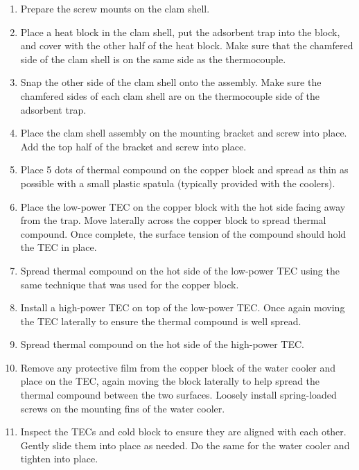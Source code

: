 \begin{enumerate}
\item Prepare the screw mounts on the clam shell.
    
\item Place a heat block in the clam shell, put the adsorbent trap into the block, and cover with the other half of the heat block. Make sure that the chamfered side of the clam shell is on the same side as the thermocouple.
    
\item Snap the other side of the clam shell onto the assembly. Make sure the chamfered sides of each clam shell are on the thermocouple side of the adsorbent trap.
    
\item Place the clam shell assembly on the mounting bracket and screw into place. Add the top half of the bracket and screw into place.
    
\item Place 5 dots of thermal compound on the copper block and spread as thin as possible with a small plastic spatula (typically provided with the coolers).
    
\item Place the low-power TEC on the copper block with the hot side facing away from the trap. Move laterally across the copper block to spread thermal compound. Once complete, the surface tension of the compound should hold the TEC in place.
    
\item Spread thermal compound on the hot side of the low-power TEC using the same technique that was used for the copper block.
    
\item Install a high-power TEC on top of the low-power TEC. Once again moving the TEC laterally to ensure the thermal compound is well spread.
    
\item Spread thermal compound on the hot side of the high-power TEC.
    
\item Remove any protective film from the copper block of the water cooler and place on the TEC, again moving the block laterally to help spread the thermal compound between the two surfaces. Loosely install spring-loaded screws on the mounting fins of the water cooler.
    
\item Inspect the TECs and cold block to ensure they are aligned with each other. Gently slide them into place as needed. Do the same for the water cooler and tighten into place.
    

\end{enumerate}

